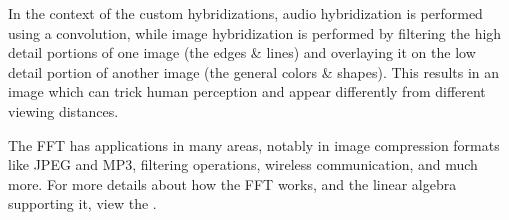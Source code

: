 \documentclass[notitlepage]{article}
\begin{document}
In the context of the custom hybridizations, audio hybridization is performed using
a convolution, while image hybridization is performed by filtering the high detail portions
of one image (the edges \& lines) and overlaying it on the low detail portion of another
image (the general colors \& shapes). This results in an image which can trick human perception
and appear differently from different viewing distances.

The FFT has applications in many areas, notably in image compression formats
like JPEG and MP3, filtering operations, wireless communication, and much more.
For more details about how the FFT works, and the linear algebra supporting it,
view the \href{}{}.
\end{document}
